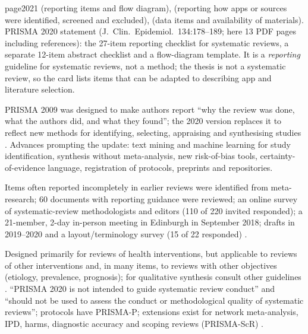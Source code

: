 \begin{papercard}{page2021}
  (reporting items and flow diagram),  (reporting how apps or sources were identified, screened and excluded),  (data items and availability of materials). PRISMA 2020 statement (J.\ Clin.\ Epidemiol.\ 134:178--189; here 13 PDF pages including references): the 27-item reporting checklist for systematic reviews, a separate 12-item abstract checklist and a flow-diagram template. It is a \emph{reporting} guideline for systematic reviews, not a method; the thesis is not a systematic review, so the card lists items that can be adapted to describing app and literature selection.

 PRISMA 2009 was designed to make authors report ``why the review was done, what the authors did, and what they found''; the 2020 version replaces it to reflect new methods for identifying, selecting, appraising and synthesising studies . Advances prompting the update: text mining and machine learning for study identification, synthesis without meta-analysis, new risk-of-bias tools, certainty-of-evidence language, registration of protocols, preprints and repositories.

 Items often reported incompletely in earlier reviews were identified from meta-research; 60 documents with reporting guidance were reviewed; an online survey of systematic-review methodologists and editors (110 of 220 invited responded); a 21-member, 2-day in-person meeting in Edinburgh in September 2018; drafts in 2019--2020 and a layout/terminology survey (15 of 22 responded) .

 Designed primarily for reviews of health interventions, but applicable to reviews of other interventions and, in many items, to reviews with other objectives (etiology, prevalence, prognosis); for qualitative synthesis consult other guidelines . ``PRISMA 2020 is not intended to guide systematic review conduct'' and ``should not be used to assess the conduct or methodological quality of systematic reviews''; protocols have PRISMA-P; extensions exist for network meta-analysis, IPD, harms, diagnostic accuracy and scoping reviews (PRISMA-ScR) .


\end{papercard}
